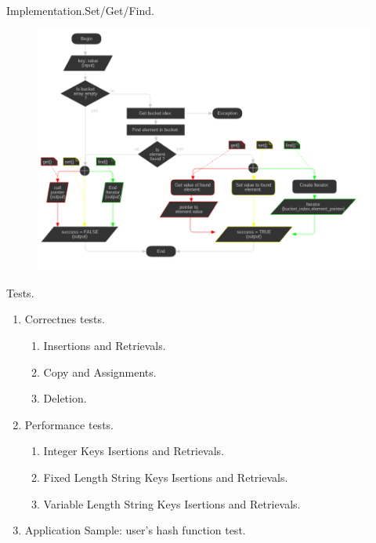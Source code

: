 \documentclass{beamer}
\begin{document}
\begin{frame}{Implementation.}{Set/Get/Find.}
  \begin{figure}
    \includegraphics[scale=0.3]{implementation_set_get_find_flowchart}
  \end{figure}
\end{frame}

\begin{frame}{Tests.}
  \begin{enumerate}
  \item Correctnes tests.
    \begin{enumerate}
    \item Insertions and Retrievals.
    \item Copy and Assignments.
    \item Deletion.
    \end{enumerate}
  \item Performance tests.
    \begin{enumerate}
    \item Integer Keys Isertions and Retrievals.
    \item Fixed Length String Keys Isertions and Retrievals.
    \item Variable Length String Keys Isertions and Retrievals.
    \end{enumerate}
  \item Application Sample: user's hash function test.
  \end{enumerate}
\end{frame}
\end{document}
